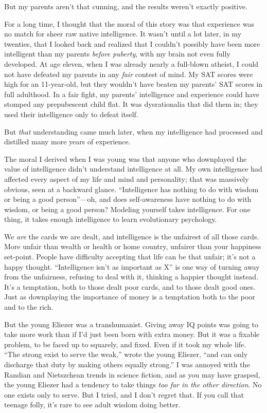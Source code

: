 {
 But my parents aren't that cunning, and the
results weren't exactly positive.}

{
 For a long time, I thought that the moral of this story was that
experience was no match for sheer raw native intelligence. It
wasn't until a lot later, in my twenties, that I looked
back and realized that I couldn't possibly have been
more intelligent than my parents \textit{before puberty}, with my brain
not even fully developed. At age eleven, when I was already nearly a
full-blown atheist, I could not have defeated my parents in any
\textit{fair} contest of mind. My SAT scores were high for an
11-year-old, but they wouldn't have beaten my
parents' SAT scores in full adulthood. In a fair fight,
my parents' intelligence and experience could have
stomped any prepubescent child flat. It was dysrationalia that did them
in; they used their intelligence only to defeat itself.}

{
 But \textit{that} understanding came much later, when my
intelligence had processed and distilled many more years of
experience.}

{
 The moral I derived when I was young was that anyone who
downplayed the value of intelligence didn't understand
intelligence at all. My own intelligence had affected every aspect of
my life and mind and personality; that was massively obvious, seen at a
backward glance. ``Intelligence has nothing to do with
wisdom or being a good person''---oh, and does
self-awareness have nothing to do with wisdom, or being a good person?
Modeling yourself takes intelligence. For one thing, it takes enough
intelligence to learn evolutionary psychology.}

{
 We \textit{are} the cards we are dealt, and intelligence is the
unfairest of all those cards. More unfair than wealth or health or home
country, unfairer than your happiness set-point. People have difficulty
accepting that life can be that unfair; it's not a
happy thought. ``Intelligence isn't as
important as X'' is one way of turning away from the
unfairness, refusing to deal with it, thinking a happier thought
instead. It's a temptation, both to those dealt poor
cards, and to those dealt good ones. Just as downplaying the importance
of money is a temptation both to the poor and to the rich.}

{
 But the young Eliezer was a transhumanist. Giving away IQ points
was going to take more work than if I'd just been born
with extra money. But it was a fixable problem, to be faced up to
squarely, and fixed. Even if it took my whole life.
``The strong exist to serve the
weak,'' wrote the young Eliezer,
``and can only discharge that duty by making others
equally strong.'' I was annoyed with the Randian and
Nietszchean trends in science fiction, and as you may have grasped, the
young Eliezer had a tendency to take things \textit{too far in the
other direction}. No one exists only to serve. But I tried, and I
don't regret that. If you call that teenage folly,
it's rare to see adult wisdom doing better.}

